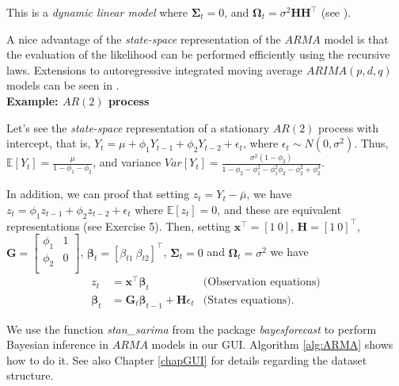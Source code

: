 This is a \textit{dynamic linear model} where $\bm{\Sigma}_t=0$, and $\bm{\Omega}_t=\sigma^2\bm{H}\bm{H}^{\top}$ (see \cite{petris2009dynamic,chib1994bayes}).

A nice advantage of the \textit{state-space} representation of the $ARMA$ model is that the evaluation of the likelihood can be performed efficiently using the recursive laws. Extensions to autoregressive integrated moving average $ARIMA(p,d,q)$ models can be seen in \cite[Chap.~3]{petris2009dynamic}.\\

\textbf{Example: $AR(2)$ process}

Let's see the \textit{state-space} representation of a stationary $AR(2)$ process with intercept, that is, $Y_t=\mu+\phi_1Y_{t-1}+\phi_2Y_{t-2}+\epsilon_t$, where $\epsilon_t\sim N(0,\sigma^2)$. Thus, $\mathbb{E}[Y_t]=\frac{\mu}{1-\phi_1-\phi_2}$, and variance $Var[Y_t]=\frac{\sigma^2(1-\phi_2)}{1-\phi_2-\phi_1^2-\phi_1^2\phi_2-\phi_2^2+\phi_2^3}$.

In addition, we can proof that setting $z_t=Y_t-\bar{\mu}$, we have $z_t=\phi_1z_{t-1}+\phi_2z_{t-2}+\epsilon_t$ where $\mathbb{E}[z_t]=0$, and these are equivalent representations (see Exercise 5). Then, setting  $\bm{x}^{\top}=[1 \ 0]$, $\bm{H}=[1 \ 0]^{\top}$, $\bm{G}=\begin{bmatrix}
	\phi_1 & 1\\
	\phi_2 & 0 \\
\end{bmatrix}$, $\bm{\beta}_t=[\beta_{t1} \ \beta_{t2}]^{\top}$, $\bm{\Sigma}_t=0$ and $\bm{\Omega}_t=\sigma^2$ we have
\begin{align*}
	z_t&=\bm{x}^{\top}\bm{\beta}_t& \text{(Observation equations)}\\
	\bm{\beta}_t&=\bm{G}_t\bm{\beta}_{t-1}+\bm{H}{\epsilon}_t & \text{(States equations)}.
\end{align*}

We use the function \textit{stan\_sarima} from the package \textit{bayesforecast} to perform Bayesian inference in $ARMA$ models in our GUI. Algorithm \ref{alg:ARMA} shows how to do it. See also Chapter \ref{chapGUI} for details regarding the dataset structure.


